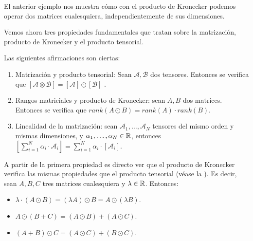 \begin{observacion}
    El anterior ejemplo nos muestra cómo con el producto de Kronecker podemos operar dos matrices cualesquiera, independientemente de sus dimensiones.
\end{observacion}

Vemos ahora tres propiedades fundamentales que tratan sobre la matrización, producto de Kronecker y el producto tensorial.

\begin{proposicion} \label{prop:fundamentales_matrizacion_kronecker} Las siguientes afirmaciones son ciertas:

    \begin{enumerate}
        \item Matrización y producto tensorial: Sean $\mathcal{A}, \mathcal{B}$ dos tensores. Entonces se verifica que $[\mathcal{A} \otimes \mathcal{B}] = [\mathcal{A}] \odot [\mathcal{B}]$ \label{prop:prop_fundamentales_primera}.
        \item Rangos matriciales y producto de Kronecker: sean $A, B$ dos matrices. Entonces se verifica que $rank(A \odot B) = rank(A) \cdot rank(B)$.
        \item Linealidad de la matrización: sean $\mathcal{A}_1, \ldots, \mathcal{A}_N$ tensores del mismo orden y mismas dimensiones, y $\alpha_1, \ldots, \alpha_N \in \mathbb{R}$, entonces $[\sum_{i = 1}^N \alpha_i \cdot \mathcal{A}_i] = \sum_{i = 1}^N \alpha_i \cdot [\mathcal{A}_i]$.
    \end{enumerate}

\end{proposicion}

\begin{observacion} A partir de la primera propiedad es directo ver que el producto de Kronecker verifica las mismas propiedades que el producto tensorial (véase la ). Es decir, sean $A, B, C$ tres matrices cualesquiera y $\lambda \in \mathbb{R}$. Entonces:

\begin{itemize}
    \item $\lambda \cdot (A \odot B) = (\lambda A) \odot B = A \odot (\lambda B)$.
    \item $A \odot (B + C) = (A \odot B) + (A \odot C)$.
    \item $(A + B) \odot C = (A \odot C) + (B \odot C)$.
\end{itemize}

\end{observacion}

